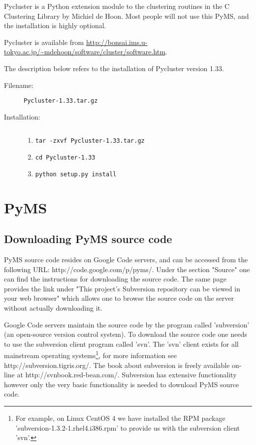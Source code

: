 Pycluster is a Python extension module to the clustering routines
in the C Clustering Library by Michiel de Hoon.  Most people will
not use this PyMS, and the installation is highly optional. 

Pycluster is available from
\url{http://bonsai.ims.u-tokyo.ac.jp/~mdehoon/software/cluster/software.htm}.

The description below refers to the installation of Pycluster version
1.33.

\begin{description}
\item [Filename:] {\tt Pycluster-1.33.tar.gz}
\item [Installation:] $ $
  \begin{enumerate}
  \item {\tt tar -zxvf Pycluster-1.33.tar.gz}
  \item {\tt cd Pycluster-1.33}
  \item {\tt python setup.py install}
  \end{enumerate}
\end{description}

\section{PyMS}

\subsection{Downloading PyMS source code}

PyMS source code resides on Google Code servers, and can be accessed
from the following URL: http://code.google.com/p/pyms/. Under the
section "Source" one can find the instructions for downloading the
source code. The same page provides the link under "This project's
Subversion repository can be viewed in your web browser" which allows
one to browse the source code on the server without actually downloading
it.

Google Code servers maintain the source code by the program called
'subversion' (an open-source version control system).  To download the
source code one needs to use the subversion client program called 'svn'.
The 'svn' client exists for all mainstream operating systems\footnote{For
example, on Linux CentOS 4 we have installed the RPM package
'subversion-1.3.2-1.rhel4.i386.rpm' to provide us with the subversion
client 'svn'.}, for more information see http://subversion.tigris.org/.
The book about subversion is freely available on-line at
http://svnbook.red-bean.com/. Subversion has extensive functionality
however only the very basic functionality is needed to download PyMS
source code.

